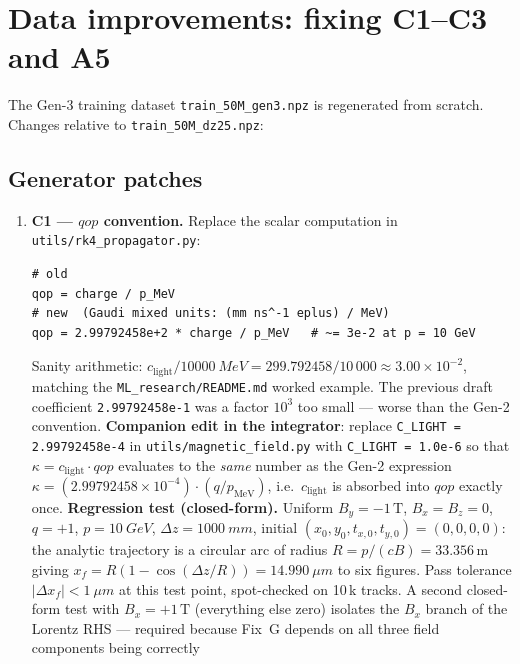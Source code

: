 \documentclass[a4paper,11pt]{article}
\newcommand{\SI}[2]{#1~#2}
\newcommand{\dz}{\Delta z}
\begin{document}
\section{Data improvements: fixing C1--C3 and A5}\label{gen3:sec:data}

The Gen-3 training dataset \texttt{train\_50M\_gen3.npz} is
regenerated from scratch.  Changes relative to
\texttt{train\_50M\_dz25.npz}:

\subsection{Generator patches}

\begin{enumerate}
  \item \textbf{C1 --- $qop$ convention.}  Replace the scalar
        computation in \texttt{utils/rk4\_propagator.py}:
        \begin{verbatim}
# old
qop = charge / p_MeV
# new  (Gaudi mixed units: (mm ns^-1 eplus) / MeV)
qop = 2.99792458e+2 * charge / p_MeV   # ~= 3e-2 at p = 10 GeV
        \end{verbatim}
        Sanity arithmetic: $c_\text{light}/\SI{10000}{MeV} =
        299.792458/10\,000 \approx 3.00\times 10^{-2}$, matching the
        \texttt{ML\_research/README.md} worked example.  The
        previous draft coefficient \texttt{2.99792458e-1} was a
        factor $10^{3}$ too small --- worse than the Gen-2
        convention.  \textbf{Companion edit in the integrator}:
        replace \texttt{C\_LIGHT = 2.99792458e-4} in
        \texttt{utils/magnetic\_field.py} with \texttt{C\_LIGHT =
        1.0e-6} so that $\kappa = c_\text{light}\cdot qop$ evaluates
        to the \emph{same} number as the Gen-2 expression
        $\kappa = (2.99792458\times 10^{-4})\cdot (q/p_\text{MeV})$,
        i.e.\ $c_\text{light}$ is absorbed into $qop$ exactly once.
        \textbf{Regression test (closed-form).}  Uniform
        $B_y=-1\,\mathrm{T}$, $B_x=B_z=0$, $q=+1$,
        $p=\SI{10}{GeV}$, $\dz=\SI{1000}{mm}$, initial
        $(x_0,y_0,t_{x,0},t_{y,0})=(0,0,0,0)$: the analytic
        trajectory is a circular arc of radius $R = p/(cB) =
        33.356\,\mathrm{m}$ giving $x_f = R(1-\cos(\dz/R)) =
        \SI{14.990}{\mu m}$ to six figures. Pass tolerance
        $|\Delta x_f|<\SI{1}{\mu m}$ at this test point, spot-checked
        on 10\,k tracks.  A second closed-form test with
        $B_x=+1\,\mathrm{T}$ (everything else zero) isolates the
        $B_x$ branch of the Lorentz RHS --- required because Fix~G
        depends on all three field components being correctly

\end{enumerate}
\end{document}
